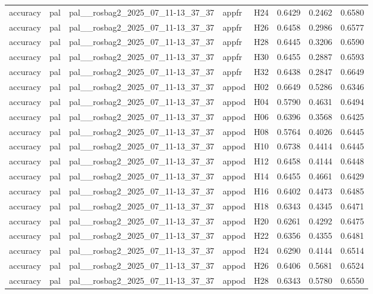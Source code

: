 \begin{table}[tbp]
\begin{tabular}{lllllrrr}
accuracy & pal & pal\_\_rosbag2\_2025\_07\_11-13\_37\_37 & appfr & H24 & 0.6429 & 0.2462 & 0.6580 \\
accuracy & pal & pal\_\_rosbag2\_2025\_07\_11-13\_37\_37 & appfr & H26 & 0.6458 & 0.2986 & 0.6577 \\
accuracy & pal & pal\_\_rosbag2\_2025\_07\_11-13\_37\_37 & appfr & H28 & 0.6445 & 0.3206 & 0.6590 \\
accuracy & pal & pal\_\_rosbag2\_2025\_07\_11-13\_37\_37 & appfr & H30 & 0.6455 & 0.2887 & 0.6593 \\
accuracy & pal & pal\_\_rosbag2\_2025\_07\_11-13\_37\_37 & appfr & H32 & 0.6438 & 0.2847 & 0.6649 \\
accuracy & pal & pal\_\_rosbag2\_2025\_07\_11-13\_37\_37 & appod & H02 & 0.6649 & 0.5286 & 0.6346 \\
accuracy & pal & pal\_\_rosbag2\_2025\_07\_11-13\_37\_37 & appod & H04 & 0.5790 & 0.4631 & 0.6494 \\
accuracy & pal & pal\_\_rosbag2\_2025\_07\_11-13\_37\_37 & appod & H06 & 0.6396 & 0.3568 & 0.6425 \\
accuracy & pal & pal\_\_rosbag2\_2025\_07\_11-13\_37\_37 & appod & H08 & 0.5764 & 0.4026 & 0.6445 \\
accuracy & pal & pal\_\_rosbag2\_2025\_07\_11-13\_37\_37 & appod & H10 & 0.6738 & 0.4414 & 0.6445 \\
accuracy & pal & pal\_\_rosbag2\_2025\_07\_11-13\_37\_37 & appod & H12 & 0.6458 & 0.4144 & 0.6448 \\
accuracy & pal & pal\_\_rosbag2\_2025\_07\_11-13\_37\_37 & appod & H14 & 0.6455 & 0.4661 & 0.6429 \\
accuracy & pal & pal\_\_rosbag2\_2025\_07\_11-13\_37\_37 & appod & H16 & 0.6402 & 0.4473 & 0.6485 \\
accuracy & pal & pal\_\_rosbag2\_2025\_07\_11-13\_37\_37 & appod & H18 & 0.6343 & 0.4345 & 0.6471 \\
accuracy & pal & pal\_\_rosbag2\_2025\_07\_11-13\_37\_37 & appod & H20 & 0.6261 & 0.4292 & 0.6475 \\
accuracy & pal & pal\_\_rosbag2\_2025\_07\_11-13\_37\_37 & appod & H22 & 0.6356 & 0.4355 & 0.6481 \\
accuracy & pal & pal\_\_rosbag2\_2025\_07\_11-13\_37\_37 & appod & H24 & 0.6290 & 0.4144 & 0.6514 \\
accuracy & pal & pal\_\_rosbag2\_2025\_07\_11-13\_37\_37 & appod & H26 & 0.6406 & 0.5681 & 0.6524 \\
accuracy & pal & pal\_\_rosbag2\_2025\_07\_11-13\_37\_37 & appod & H28 & 0.6343 & 0.5780 & 0.6550 \\

\end{tabular}
\end{table}
